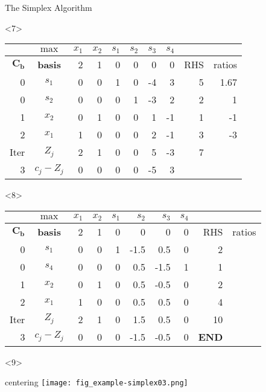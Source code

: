 \begin{frameExample}{The Simplex Algorithm}{}
\begin{onlyenv}<7>
      {\centering
      \begin{tabular}{rc|rrrrrr|rr}
  &  $\max$ & $x_1$ & $x_2$ & $s_1$ &$ s_2$ & $s_3$ & $s_4$ & & \\
  \toprule
$\mathbf{C_b}$ & \textbf{basis} & 2 & 1 & 0 & 0 & 0 & 0 & RHS & ratios \\
  \midrule
0 & $s_1$ & 0 & 0 & 1 & 0 & -4 & 3 & 5 & 1.67 \\
0 & $s_2$ & 0 & 0 & 0 & 1 & -3 & \cellcolor{yellow}2 & 2 & 1 \\
1 & $x_2$ & 0 & 1 & 0 & 0 & 1 & -1 & 1 & -1 \\
        2 & $x_1$ & 1 & 0 & 0 & 0 & 2 & -1 & 3 & -3 \\
        \midrule
Iter & $Z_j$ & 2 & 1 & 0 & 0 & 5 & -3 & 7 &  \\
3 & $c_j - Z_j$ & 0 & 0 & 0 & 0 & -5 & 3 &  & 
\end{tabular}
  \par}
\end{onlyenv}

\begin{onlyenv}<8>
      {\centering
      \begin{tabular}{rc|rrrrrr|rr}
  &  $\max$ & $x_1$ & $x_2$ & $s_1$ &$ s_2$ & $s_3$ & $s_4$ & & \\
  \toprule
$\mathbf{C_b}$ & \textbf{basis} & 2 & 1 & 0 & 0 & 0 & 0 & RHS & ratios \\
  \midrule
0 & $s_1$ & 0 & 0 & 1 & -1.5 & 0.5 & 0 & 2 &  \\
0 & $s_4$ & 0 & 0 & 0 & 0.5 & -1.5 & \cellcolor{yellow}1 & 1 &  \\
1 & $x_2$ & 0 & 1 & 0 & 0.5 & -0.5 & 0 & 2 &  \\
        2 & $x_1$ & 1 & 0 & 0 & 0.5 & 0.5 & 0 & 4 &  \\
        \midrule
Iter & $Z_j$ & 2 & 1 & 0 & 1.5 & 0.5 & 0 & 10 &  \\
3 & $c_j - Z_j$ & 0 & 0 & 0 & -1.5 & -0.5 & 0 &\textbf{END}  & 
\end{tabular}
  \par}
\end{onlyenv}


\begin{onlyenv}<9>
  {centering
  \texttt{[image: fig\_example-simplex03.png]}
  \par}
\end{onlyenv}
\end{frameExample}



